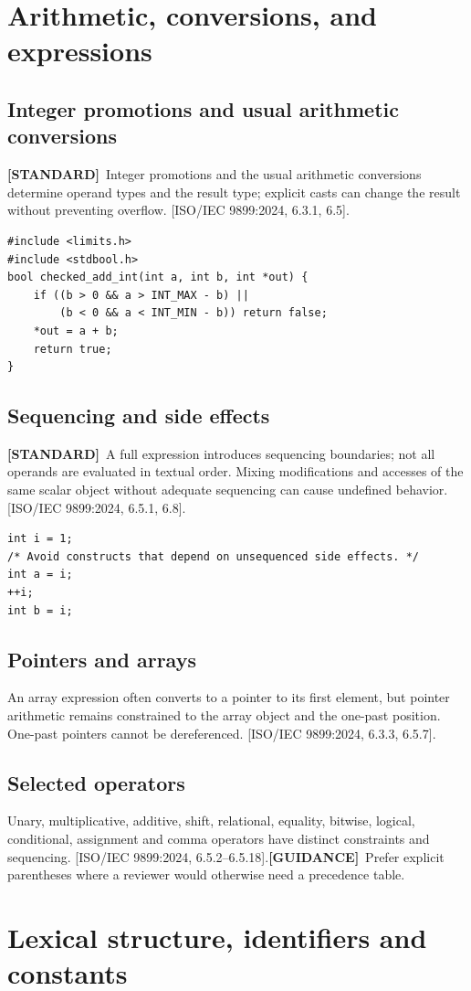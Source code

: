 \documentclass[10pt,letterpaper,oneside]{report}
\newcommand{\refcl}[1]{\textsf{\footnotesize[ISO/IEC 9899:2024, #1]}}
\newcommand{\standard}{\textbf{[STANDARD]}}
\newcommand{\guidance}{\textbf{[GUIDANCE]}}
\begin{document}
\chapter{Arithmetic, conversions, and expressions}
\section{Integer promotions and usual arithmetic conversions}
\standard\ Integer promotions and the usual arithmetic conversions determine operand types and the result type; explicit casts can change the result without preventing overflow. \refcl{6.3.1, 6.5}.
\begin{lstlisting}
#include <limits.h>
#include <stdbool.h>
bool checked_add_int(int a, int b, int *out) {
    if ((b > 0 && a > INT_MAX - b) ||
        (b < 0 && a < INT_MIN - b)) return false;
    *out = a + b;
    return true;
}
\end{lstlisting}
\section{Sequencing and side effects}
\standard\ A full expression introduces sequencing boundaries; not all operands are evaluated in textual order. Mixing modifications and accesses of the same scalar object without adequate sequencing can cause undefined behavior. \refcl{6.5.1, 6.8}.
\begin{lstlisting}
int i = 1;
/* Avoid constructs that depend on unsequenced side effects. */
int a = i;
++i;
int b = i;
\end{lstlisting}
\section{Pointers and arrays}
An array expression often converts to a pointer to its first element, but pointer arithmetic remains constrained to the array object and the one-past position. One-past pointers cannot be dereferenced. \refcl{6.3.3, 6.5.7}.
\section{Selected operators}
Unary, multiplicative, additive, shift, relational, equality, bitwise, logical, conditional, assignment and comma operators have distinct constraints and sequencing. \refcl{6.5.2--6.5.18}.\guidance\ Prefer explicit parentheses where a reviewer would otherwise need a precedence table.
\chapter{Lexical structure, identifiers and constants}
\end{document}
